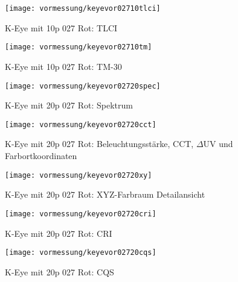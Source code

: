 \documentclass[pagesize,paper=A4,fontsize=12pt,utf8,numbers=noenddot,bibliography=totoc,listof=totoc,DIV=11,BCOR=1mm]{scrreprt}
\begin{document}
\begin{figure}[htp]     %
\centering
\texttt{[image: vormessung/keyevor02710tlci]} 
\caption {K-Eye mit 10p 027 Rot: TLCI} 
\end{figure}

\begin{figure}[htp]     %
\centering
\texttt{[image: vormessung/keyevor02710tm]} 
\caption {K-Eye mit 10p 027 Rot: TM-30} 
\end{figure}




\begin{figure}[htp]     %
\centering
\texttt{[image: vormessung/keyevor02720spec]} 
\caption {K-Eye mit 20p 027 Rot: Spektrum} 
\end{figure}

\begin{figure}[htp]     %
\centering
\texttt{[image: vormessung/keyevor02720cct]} 
\caption {K-Eye mit 20p 027 Rot: Beleuchtungsstärke, CCT, $\Delta$UV und Farbortkoordinaten} 
\end{figure}

\begin{figure}[htp]     %
\centering
\texttt{[image: vormessung/keyevor02720xy]} 
\caption {K-Eye mit 20p 027 Rot: XYZ-Farbraum Detailansicht} 
\end{figure}

\begin{figure}[htp]     %
\centering
\texttt{[image: vormessung/keyevor02720cri]} 
\caption {K-Eye mit 20p 027 Rot: CRI} 
\end{figure}

\begin{figure}[htp]     %
\centering
\texttt{[image: vormessung/keyevor02720cqs]} 
\caption {K-Eye mit 20p 027 Rot: CQS} 
\end{figure}
\end{document}
